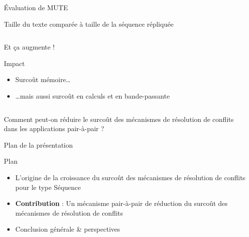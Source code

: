 \begin{frame}{Évaluation de MUTE}
\begin{block}{Taille du texte comparée à taille de la séquence répliquée}
\begin{columns}
\begin{column}{0.4\textwidth}
\begin{center}
                    \alert{Et ça augmente !}
                \end{center}
                \pause
                \begin{block}{Impact}
                    \begin{itemize}
                        \item Surcoût \alert{mémoire}\dots
                        \item \dots mais aussi surcoût en \alert{calculs} et en \alert{bande-passante}
                    \end{itemize}
                \end{block}
            \end{column}
        \end{columns}
    \end{block}
\end{frame}

\begin{frame}[standout]
    Comment peut-on \alert{réduire le surcoût} des mécanismes de résolution de conflits dans les applications pair-à-pair ?
\end{frame}

\begin{frame}{Plan de la présentation}
    \begin{block}{Plan}
        \begin{itemize}
            \item L'origine de la croissance du surcoût des mécanismes de résolution de conflits pour le type Séquence
            \pause
            \item \textbf{Contribution} : Un mécanisme pair-à-pair de réduction du surcoût des mécanismes de résolution de conflits
            \pause
            \item Conclusion générale \& perspectives
        \end{itemize}
    \end{block}
\end{frame}
